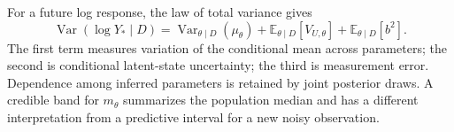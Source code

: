     For a future log response, the law of total variance gives
    \[
        \operatorname{Var}(\log Y_*\mid D)
        =\operatorname{Var}_{\theta\mid D}(\mu_\theta)
        +\mathbb E_{\theta\mid D}[V_{U,\theta}]
        +\mathbb E_{\theta\mid D}[b^2].
    \]
    The first term measures variation of the conditional mean across
    parameters; the second is conditional latent-state uncertainty; the third
    is measurement error. Dependence among inferred parameters is retained by
    joint posterior draws. A credible band for \(m_\theta\) summarizes the
    population median and has a different interpretation from a predictive
    interval for a new noisy observation.




